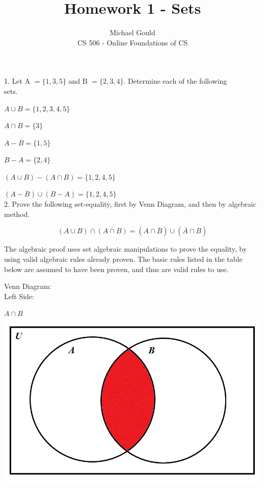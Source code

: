 \documentclass[10pt]{article}
\begin{document}
\title{Homework 1 - Sets}
\author{Michael Gould\\ 
CS 506 - Online Foundations of CS}
 
\maketitle

1. Let A $= \{1,3,5\}$ and B $= \{2,3,4\}$.  Determine each of the following \\sets.

$A \cup B = \{1,2,3,4,5\}$

$A \cap B = \{3\}$

$A - B = \{1,5\}$

$B - A = \{2,4\}$

$(A \cup B) - (A \cap B ) = \{1,2,4,5\}$

$(A - B) \cup (B - A) = \{1,2,4,5\}$\\


2. Prove the following set-equality, first by Venn Diagram, and then by algebraic method.

$$(A \cup B) \cap \overline{(A \cap B )}  = (A \cap \overline{B}) \cup (\overline{A} \cap B)$$

The algebraic proof uses set algebraic manipulations to prove the equality, by using valid algebraic rules already proven.  The basic rules listed in the table below are assumed to have been proven, and thus are valid rules to use.

Venn Diagram:\\

Left Side:

$A \cap B$\\
\includegraphics[scale=0.3]{1}
\end{document}
